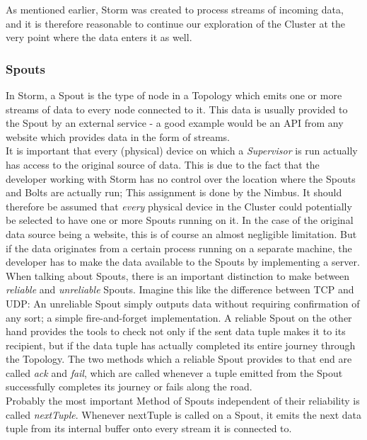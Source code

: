 \documentclass[12pt,a4paper]{article}
\begin{document}
As mentioned earlier, Storm was created to process streams of incoming data, and it is therefore reasonable to continue our exploration of the Cluster at the very point where the data enters it as well.

\subsubsection{Spouts}

In Storm, a Spout is the type of node in a Topology which emits one or more streams of data to every node connected to it. This data is usually provided to the Spout by an external service - a good example would be an API from any website which provides data in the form of streams. \\

It is important that every (physical) device on which a \textit{Supervisor} is run actually has access to the original source of data. This is due to the fact that the developer working with Storm has no control over the location where the Spouts and Bolts are actually run; This assignment is done by the Nimbus. It should therefore be assumed that \textit{every} physical device in the Cluster could potentially be selected to have one or more Spouts running on it. In the case of the original data source being a website, this is of course an almost negligible limitation. But if the data originates from a certain process running on a separate machine, the developer has to make the data available to the Spouts by implementing a server.\\

When talking about Spouts, there is an important distinction to make between \textit{reliable} and \textit{unreliable} Spouts. Imagine this like the difference between TCP and UDP: An unreliable Spout simply outputs data without requiring confirmation of any sort; a simple fire-and-forget implementation. A reliable Spout on the other hand provides the tools to check not only if the sent data tuple makes it to its recipient, but if the data tuple has actually completed its entire journey through the Topology. The two methods which a reliable Spout provides to that end are called \textit{ack} and \textit{fail}, which are called whenever a tuple emitted from the Spout successfully completes its journey or fails along the road.\\

Probably the most important Method of Spouts independent of their reliability is called \textit{nextTuple}. Whenever nextTuple is called on a Spout, it emits the next data tuple from its internal buffer onto every stream it is connected to.
\end{document}
